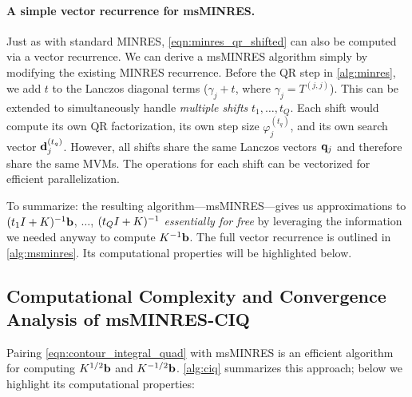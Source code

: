 \paragraph{A simple vector recurrence for msMINRES.}
Just as with standard MINRES, \cref{eqn:minres_qr_shifted} can also be computed via a vector recurrence.
We can derive a msMINRES algorithm simply by modifying the existing MINRES recurrence.
Before the QR step in \cref{alg:minres}, we add $t$ to the Lanczos diagonal terms ($\gamma_j + t$, where $\gamma_j = T^{(j,j)}$).
This can be extended to simultaneously handle \emph{multiple shifts} $t_1, \ldots, t_Q$.
Each shift would compute its own QR factorization, its own step size $\varphi_j^{(t_q)}$, and its own search vector $\mathbf{d}_j^{(t_q)}$.
However, all shifts share the same Lanczos vectors $\mathbf{q}_j$ and therefore share the same MVMs.
The operations for each shift can be vectorized for efficient parallelization.

To summarize: the resulting algorithm---msMINRES---gives us approximations to $(t_1 I + K)^{-1} \mathbf{b}$, $\ldots$, $(t_Q I + K)^{-1}$ \emph{essentially for free} by leveraging the information we needed anyway to compute $K^{-1} \mathbf{b}$.
The full vector recurrence is outlined in \cref{alg:msminres}.
Its computational properties will be highlighted below.




\subsection{Computational Complexity and Convergence Analysis of msMINRES-CIQ}
Pairing \cref{eqn:contour_integral_quad} with msMINRES is an efficient algorithm for computing $K^{1/2} \mathbf{b}$ and $K^{-1/2} \mathbf{b}$.
\cref{alg:ciq} summarizes this approach; below we highlight its computational properties:

\label{sec:convergence}

